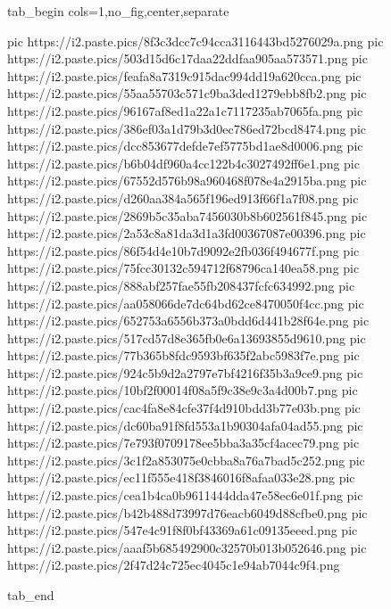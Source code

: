  
 
 
 
 

\ifcmt
  tab_begin cols=1,no_fig,center,separate

     pic https://i2.paste.pics/8f3c3dcc7c94cca3116443bd5276029a.png
		 pic https://i2.paste.pics/503d15d6c17daa22ddfaa905aa573571.png
		 pic https://i2.paste.pics/feafa8a7319c915dac994dd19a620cca.png
		 pic https://i2.paste.pics/55aa55703c571c9ba3ded1279ebb8fb2.png
		 pic https://i2.paste.pics/96167af8ed1a22a1c7117235ab7065fa.png
		 pic https://i2.paste.pics/386ef03a1d79b3d0ec786ed72bcd8474.png
		 pic https://i2.paste.pics/dcc853677defde7ef5775bd1ae8d0006.png
		 pic https://i2.paste.pics/b6b04df960a4cc122b4c3027492ff6e1.png
		 pic https://i2.paste.pics/67552d576b98a960468f078e4a2915ba.png
		 pic https://i2.paste.pics/d260aa384a565f196ed913f66f1a7f08.png
		 pic https://i2.paste.pics/2869b5c35aba7456030b8b602561f845.png
		 pic https://i2.paste.pics/2a53c8a81da3d1a3fd00367087e00396.png
		 pic https://i2.paste.pics/86f54d4e10b7d9092e2fb036f494677f.png
		 pic https://i2.paste.pics/75fcc30132c594712f68796ca140ea58.png
		 pic https://i2.paste.pics/888abf257fae55fb208437fcfc634992.png
		 pic https://i2.paste.pics/aa058066de7dc64bd62ce8470050f4cc.png
		 pic https://i2.paste.pics/652753a6556b373a0bdd6d441b28f64e.png
		 pic https://i2.paste.pics/517cd57d8e365fb0e6a13693855d9610.png
		 pic https://i2.paste.pics/77b365b8fdc9593bf635f2abc5983f7e.png
		 pic https://i2.paste.pics/924c5b9d2a2797e7bf4216f35b3a9ce9.png
		 pic https://i2.paste.pics/10bf2f00014f08a5f9c38e9c3a4d00b7.png
		 pic https://i2.paste.pics/cac4fa8e84cfe37f4d910bdd3b77e03b.png
		 pic https://i2.paste.pics/dc60ba91f8fd553a1b90304afa04ad55.png
		 pic https://i2.paste.pics/7e793f0709178ee5bba3a35cf4acec79.png
		 pic https://i2.paste.pics/3c1f2a853075e0cbba8a76a7bad5c252.png
		 pic https://i2.paste.pics/ec11f555e418f3846016f8afaa033e28.png
		 pic https://i2.paste.pics/cea1b4ca0b9611444dda47e58ec6e01f.png
		 pic https://i2.paste.pics/b42b488d73997d76eacb6049d88cfbe0.png
		 pic https://i2.paste.pics/547e4c91f8f0bf43369a61c09135eeed.png
		 pic https://i2.paste.pics/aaaf5b685492900c32570b013b052646.png
		 pic https://i2.paste.pics/2f47d24c725ec4045c1e94ab7044c9f4.png

  tab_end
\fi

